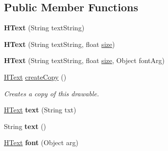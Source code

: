 \subsection*{Public Member Functions}
\begin{DoxyCompactItemize}
\item 
\hypertarget{classhype_1_1drawable_1_1_h_text_ac9b84354f82c63669dd676eb988b6425}{{\bfseries H\-Text} (String text\-String)}\label{classhype_1_1drawable_1_1_h_text_ac9b84354f82c63669dd676eb988b6425}

\item 
\hypertarget{classhype_1_1drawable_1_1_h_text_a670828657fd6d3443dc99d404b6436a3}{{\bfseries H\-Text} (String text\-String, float \hyperlink{classhype_1_1drawable_1_1_h_drawable_a2d458cc012ce0421b443879baf054d0d}{size})}\label{classhype_1_1drawable_1_1_h_text_a670828657fd6d3443dc99d404b6436a3}

\item 
\hypertarget{classhype_1_1drawable_1_1_h_text_af39e7ea27726741693fd6c957ccd02cf}{{\bfseries H\-Text} (String text\-String, float \hyperlink{classhype_1_1drawable_1_1_h_drawable_a2d458cc012ce0421b443879baf054d0d}{size}, Object font\-Arg)}\label{classhype_1_1drawable_1_1_h_text_af39e7ea27726741693fd6c957ccd02cf}

\item 
\hyperlink{classhype_1_1drawable_1_1_h_text}{H\-Text} \hyperlink{classhype_1_1drawable_1_1_h_text_ae908bda8c33aa5a70e82e4ae1b8f3187}{create\-Copy} ()
\begin{DoxyCompactList}\small\item\em Creates a copy of this drawable. \end{DoxyCompactList}\item 
\hypertarget{classhype_1_1drawable_1_1_h_text_a647993e931bb74cdf36ff2eb7d3ed30f}{\hyperlink{classhype_1_1drawable_1_1_h_text}{H\-Text} {\bfseries text} (String txt)}\label{classhype_1_1drawable_1_1_h_text_a647993e931bb74cdf36ff2eb7d3ed30f}

\item 
\hypertarget{classhype_1_1drawable_1_1_h_text_ae5d3e5e1a7d0cc2578327408936dd740}{String {\bfseries text} ()}\label{classhype_1_1drawable_1_1_h_text_ae5d3e5e1a7d0cc2578327408936dd740}

\item 
\hypertarget{classhype_1_1drawable_1_1_h_text_a539acc29624f344e82c7a43e342ec927}{\hyperlink{classhype_1_1drawable_1_1_h_text}{H\-Text} {\bfseries font} (Object arg)}\label{classhype_1_1drawable_1_1_h_text_a539acc29624f344e82c7a43e342ec927}


\end{DoxyCompactItemize}
